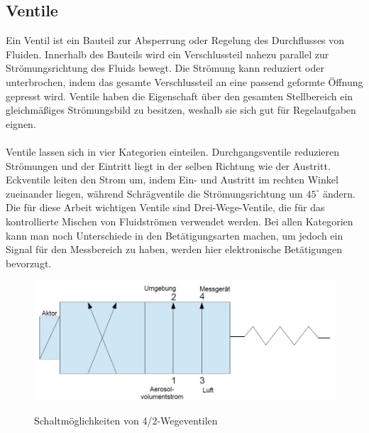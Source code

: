\subsection{Ventile}
Ein Ventil ist ein Bauteil zur Absperrung oder Regelung des Durchflusses von Fluiden. Innerhalb des Bauteils wird ein Verschlussteil nahezu parallel zur Str\"{o}mungsrichtung des Fluids bewegt. Die Str\"{o}mung kann reduziert oder unterbrochen, indem das gesamte Verschlussteil an eine passend geformte \"{O}ffnung gepresst wird. Ventile haben die Eigenschaft \"{u}ber den gesamten Stellbereich ein gleichm\"{a}{\ss}iges Str\"{o}mungsbild zu besitzen, weshalb sie sich gut f\"{u}r Regelaufgaben eignen.
\\\\
Ventile lassen sich in vier Kategorien einteilen. Durchgangsventile reduzieren Str\"{o}mungen und der Eintritt liegt in der selben Richtung wie der Austritt. Eckventile leiten den Strom um, indem Ein- und Austritt im rechten Winkel zueinander liegen, w\"{a}hrend Schr\"{a}gventile die Str\"{o}mungsrichtung um \(45^\circ\) \"{a}ndern. Die f\"{u}r diese Arbeit wichtigen Ventile sind Drei-Wege-Ventile, die f\"{u}r das kontrollierte Mischen von Fluidstr\"{o}men verwendet werden. Bei allen Kategorien kann man noch Unterschiede in den Bet\"{a}tigungsarten machen, um jedoch ein Signal f\"{u}r den Messbereich zu haben, werden hier elektronische Bet\"{a}tigungen bevorzugt\cite{ventil}.
\begin{figure}[H]
        \myfloatalign
        {\includegraphics[width=.9\linewidth]{gfx/concepts/ventil_feder.jpg}} \quad
        \caption[Schaltm\"{o}glichkeiten von 4/2-Wegeventilen]
        {Schaltm\"{o}glichkeiten von 4/2-Wegeventilen}
        \label{fig:ventil}
\end{figure}

